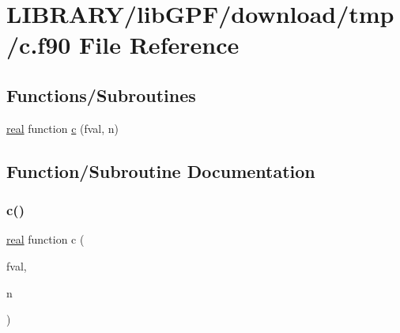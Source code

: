 \hypertarget{c_8f90}{}\section{L\+I\+B\+R\+A\+R\+Y/lib\+G\+P\+F/download/tmp/c.f90 File Reference}
\label{c_8f90}
\subsection*{Functions/\+Subroutines}
\begin{DoxyCompactItemize}
\item 
\hyperlink{read__watch_83_8txt_abdb62bde002f38ef75f810d3a905a823}{real} function \hyperlink{c_8f90_aeb1f4e639be0213b4cbd07f2583a5b1f}{c} (fval, n)
\end{DoxyCompactItemize}


\subsection{Function/\+Subroutine Documentation}
\mbox{\label{c_8f90_aeb1f4e639be0213b4cbd07f2583a5b1f}} 
\subsubsection{\texorpdfstring{c()}{c()}}
{\footnotesize\ttfamily \hyperlink{read__watch_83_8txt_abdb62bde002f38ef75f810d3a905a823}{real} function c (\begin{DoxyParamCaption}\item[{}]{fval,  }\item[{}]{n }\end{DoxyParamCaption})}

